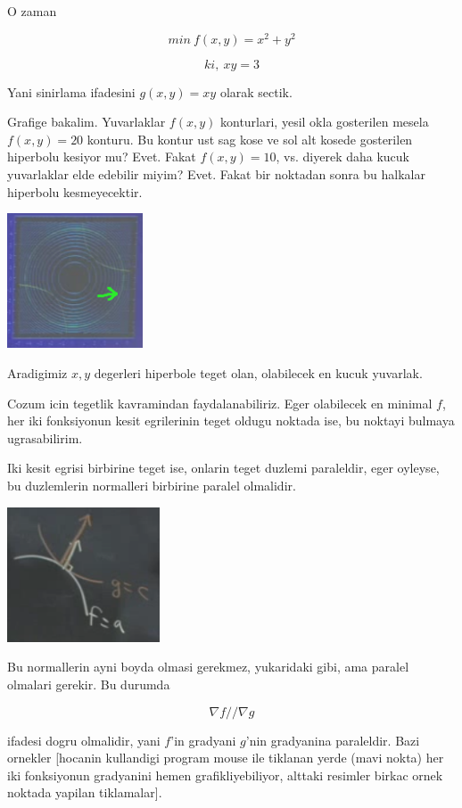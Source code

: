 \documentclass[12pt,fleqn]{article}
\begin{document}
O zaman

\[ min \ f(x,y) = x^2 + y^2 \]

\[ ki, \ xy = 3  \]

Yani sinirlama ifadesini $g(x,y) = xy$ olarak sectik. 

Grafige bakalim. Yuvarlaklar $f(x,y)$ konturlari, yesil okla gosterilen
mesela $f(x,y) = 20$ konturu. Bu kontur ust sag kose ve sol alt kosede
gosterilen hiperbolu kesiyor mu? Evet. Fakat $f(x,y) = 10$, vs. diyerek
daha kucuk yuvarlaklar elde edebilir miyim? Evet. Fakat bir noktadan sonra
bu halkalar hiperbolu kesmeyecektir. 

\includegraphics[height=4cm]{13_2.png}

Aradigimiz $x,y$ degerleri hiperbole teget olan, olabilecek en kucuk
yuvarlak.

Cozum icin tegetlik kavramindan faydalanabiliriz. Eger olabilecek en
minimal $f$, her iki fonksiyonun kesit egrilerinin teget oldugu noktada
ise, bu noktayi bulmaya ugrasabilirim. 

Iki kesit egrisi birbirine teget ise, onlarin teget duzlemi paraleldir,
eger oyleyse, bu duzlemlerin normalleri birbirine paralel olmalidir. 

\includegraphics[height=4cm]{13_3.png}

Bu normallerin ayni boyda olmasi gerekmez, yukaridaki gibi, ama paralel
olmalari gerekir. Bu durumda 

\[ \nabla f // \nabla g \]

ifadesi dogru olmalidir, yani $f$'in gradyani $g$'nin gradyanina
paraleldir. Bazi ornekler [hocanin kullandigi program mouse ile tiklanan
yerde (mavi nokta) her iki fonksiyonun gradyanini hemen grafikliyebiliyor,
alttaki resimler birkac ornek noktada yapilan tiklamalar]. 
\end{document}
